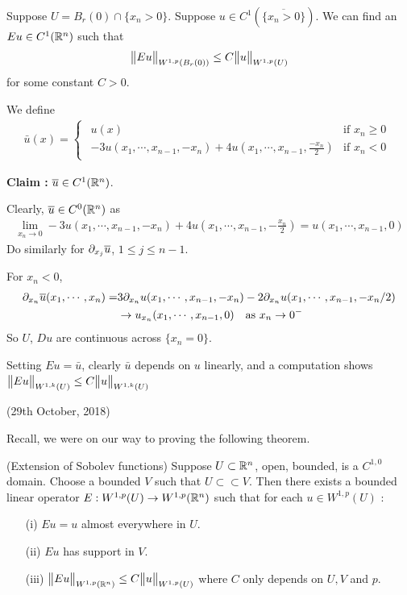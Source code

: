 \documentclass[10pt,a4paper]{report}
\newenvironment{proof}
{\begin{changemargin}{1cm}{0.5cm} 
	}%
	{\end{changemargin}
}
\newenvironment{subproof}
{\begin{changemargin}{0.5cm}{0.5cm} 
	}%
	{\end{changemargin}
}
\begin{document}
\lem Suppose $U = B_r(0) \cap \{x_n >0 \}$.  Suppose $u \in C^1( \overline{\{x_n>0 \}})$. We can find an $Eu \in C^1(\mathbb{R}^n)$ such that
\begin{align*}
\bigl\lVert Eu\bigr\rVert_{W^{1,p}(B_r(0))} \leq C \bigl\lVert u\bigr\rVert_{W^{1,p}(U)}
\end{align*}
for some constant $C>0$.
\begin{proof}
\pf We define \begin{align*}
\bar{u}(x) = \begin{cases}
\begin{array}{lc}
u(x) & \text{if } x_n \geq 0 \\
-3u(x_1, \cdots, x_{n-1},-x_n) + 4u(x_1,\cdots, x_{n-1},\frac{-x_n}{2}) & \text{if } x_n<0
\end{array}
\end{cases}
\end{align*}
\begin{subproof}
\textbf{Claim :} $\overline{u} \in C^1(\mathbb{R}^n)$.

\quad Clearly, $\overline{u} \in C^0(\mathbb{R}^n)$ as
\begin{align*}
\lim_{x_n \rightarrow 0} -3u(x_1, \cdots,x_{n-1},-x_n) + 4u(x_1, \cdots, x_{n-1},-\frac{x_n}{2}) = u(x_1, \cdots, x_{n-1},0)
\end{align*}
Do similarly for $\partial_{x_j} \overline{u}$, $1\leq j\leq n-1$.

\quad For $x_n <0$,
\begin{align*}
\partial_{x_n} \overline{u}(x_1,\cdots, x_n) =& 3\partial_{x_n} u(x_1, \cdots, x_{n-1},-x_n) -2\partial_{x_n} u(x_1, \cdots, x_{n-1},-x_n/2)\\
& \rightarrow u_{x_n}(x_1, \cdots, x_{n-1},0) \quad \text{as } x_n \rightarrow 0^-
\end{align*}
So $U$, $Du$ are continuous across $\{x_n=0\}$. 
\end{subproof}
Setting $Eu = \bar{u}$, clearly $\bar{u}$ depends on $u$ linearly, and a computation shows $\bigl\lVert Eu\bigr\rVert_{W^{1,k}(U)} \leq C \bigl\lVert u\bigr\rVert_{W^{1,k}(U)}$

\eop
\end{proof}
\s

\newday

(29th October, 2018)
\s

Recall, we were on our way to proving the following theorem.
\s

\thm (Extension of Sobolev functions) Suppose $U\subset \mathbb{R}^n$, open, bounded, is a $C^{1,0}$ domain. Choose a bounded $V$ such that $U \subset\subset V$. Then there exists a bounded linear operator $E : W^{1,p}(U) \rightarrow W^{1,p}(\mathbb{R}^n)$ such that for each $u \in W^{1,p}(U)$ :
\begin{itemize}
\item[(i)] $Eu =u$ almost everywhere in $U$.
\item[(ii)] $Eu$ has support in $V$.
\item[(iii)] $\bigl\lVert Eu\bigr\rVert_{W^{1,p}(\mathbb{R}^n)} \leq C \bigl\lVert u\bigr\rVert_{W^{1,p}(U)}$ where $C$ only depends on $U,V$ and $p$.
\end{itemize}
\s
\end{document}
